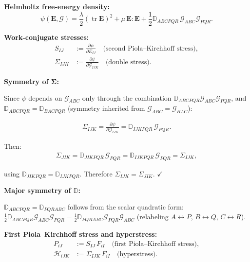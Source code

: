 \documentclass[11pt]{article}
\DeclareMathOperator{\tr}{tr}
\begin{document}
\textbf{Helmholtz free-energy density:}
\begin{equation}
\psi(\mathbf{E},\bm{\mathcal{G}})
= \frac{\lambda}{2}(\tr\mathbf{E})^{2}
  + \mu\,\mathbf{E}:\mathbf{E}
  + \frac{1}{2}\mathbb{D}_{ABCPQR}\,
    \mathcal{G}_{ABC}\mathcal{G}_{PQR}.
\end{equation}

\textbf{Work-conjugate stresses:}
\begin{align}
S_{IJ} &:= \frac{\partial\psi}{\partial E_{IJ}}
\quad\text{(second Piola--Kirchhoff stress)},
\\
\Sigma_{IJK} &:= \frac{\partial\psi}{\partial\mathcal{G}_{IJK}}
\quad\text{(double stress)}.
\end{align}

\textbf{Symmetry of $\boldsymbol{\Sigma}$:}

Since $\psi$ depends on $\mathcal{G}_{ABC}$ only through the
combination $\mathbb{D}_{ABCPQR}\mathcal{G}_{ABC}\mathcal{G}_{PQR}$,
and $\mathbb{D}_{ABCPQR}=\mathbb{D}_{BACPQR}$ (symmetry inherited
from $\mathcal{G}_{ABC}=\mathcal{G}_{BAC}$):

\begin{align}
\Sigma_{IJK}
= \frac{\partial\psi}{\partial\mathcal{G}_{IJK}}
= \mathbb{D}_{IJKPQR}\,\mathcal{G}_{PQR}.
\end{align}

Then:
\begin{align}
\Sigma_{JIK}
= \mathbb{D}_{JIKPQR}\,\mathcal{G}_{PQR}
= \mathbb{D}_{IJKPQR}\,\mathcal{G}_{PQR}
= \Sigma_{IJK},
\end{align}

using $\mathbb{D}_{JIKPQR}=\mathbb{D}_{IJKPQR}$. Therefore
$\Sigma_{IJK}=\Sigma_{JIK}$. $\checkmark$

\textbf{Major symmetry of $\mathbb{D}$:}

$\mathbb{D}_{ABCPQR}=\mathbb{D}_{PQRABC}$ follows from the scalar
quadratic form:
$\tfrac12\mathbb{D}_{ABCPQR}\mathcal{G}_{ABC}\mathcal{G}_{PQR}
= \tfrac12\mathbb{D}_{PQRABC}\mathcal{G}_{PQR}\mathcal{G}_{ABC}$
(relabeling $A\leftrightarrow P$, $B\leftrightarrow Q$,
$C\leftrightarrow R$).

\textbf{First Piola--Kirchhoff stress and hyperstress:}
\begin{align}
P_{iJ} &:= S_{IJ}\,F_{iI}
\quad\text{(first Piola--Kirchhoff stress)},
\\
\mathcal{H}_{iJK} &:= \Sigma_{IJK}\,F_{iI}
\quad\text{(hyperstress)}.
\end{align}
\end{document}
